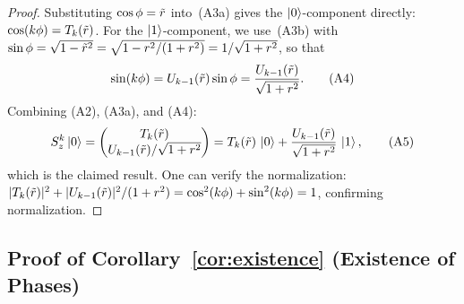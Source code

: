 \begin{proof}
	Substituting $\cos\phi = \tilde{r}$ into~(A3a) gives the
	$\ket{0}$-component directly:
	$\cos(k\phi) = T_k(\tilde{r})$.  For the
	$\ket{1}$-component, we use~(A3b) with
	$\sin\phi = \sqrt{1 - \tilde{r}^2} = \sqrt{1 - r^2/(1+r^2)} =
		1/\sqrt{1+r^2}$, so that
	\begin{equation}
		\sin(k\phi) = U_{k-1}(\tilde{r})\sin\phi = \frac{U_{k-1}(\tilde{r})}{\sqrt{1+r^2}}.
		\tag{A4}
	\end{equation}
	Combining (A2), (A3a), and (A4):
	\begin{equation}
		S_z^k\ket{0} = \begin{pmatrix} T_k(\tilde{r}) \\ U_{k-1}(\tilde{r})/\sqrt{1+r^2} \end{pmatrix}
		= T_k(\tilde{r})\,\ket{0} + \frac{U_{k-1}(\tilde{r})}{\sqrt{1+r^2}}\,\ket{1},
		\tag{A5}
	\end{equation}
	which is the claimed result.  One can verify the
	normalization: $|T_k(\tilde{r})|^2 +
		|U_{k-1}(\tilde{r})|^2/(1+r^2) = \cos^2(k\phi) +
		\sin^2(k\phi) = 1$, confirming normalization.
\end{proof}

\subsection*{Proof of Corollary~\ref{cor:existence} (Existence of Phases)}

